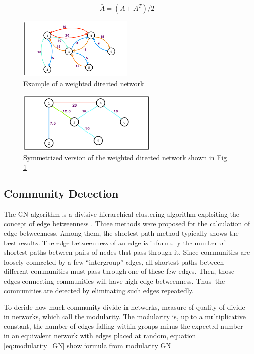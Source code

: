 \documentclass[conference]{IEEEtran}
\begin{document}
\begin{equation}
	\label{eq:symmetrizing}
	\bar{A} = (A + A^T)/2
\end{equation}

\begin{figure}[h]
\centering
\includegraphics[width=\columnwidth, height=3cm,keepaspectratio]{figure/bidirectional_edge}
\caption{Example of a weighted directed network}
\label{bidirectional_edge}
\end{figure}

\begin{figure}[h]
\centering
\includegraphics[width=\columnwidth, height=3cm,keepaspectratio]{figure/undirected_edge}
\caption{Symmetrized version of the weighted directed network shown in Fig \ref{bidirectional_edge}}
\label{undirected_edge}
\end{figure}

\subsection{Community Detection}
The GN algorithm is a divisive hierarchical clustering algorithm exploiting the concept of edge betweenness \cite{Newman}. Three methods were proposed for the calculation of edge betweenness. Among them, the shortest-path method typically shows the best results. The edge betweenness of an edge is informally the number of shortest paths between pairs of nodes that pass through it. Since communities are loosely connected by a few “intergroup” edges, all shortest paths between different communities must pass through one of these few edges. Then, those edges connecting communities will have high edge betweenness. Thus, the communities are detected by eliminating such edges repeatedly.

To decide how much community divide in networks, measure of quality of divide in networks, which  call the modularity. The modularity is, up to a multiplicative constant, the number of edges falling within groups minus the expected number in an equivalent network with edges placed at random, equation \ref{eq:modularity_GN} show formula from modularity GN \cite{Newman}
\end{document}
